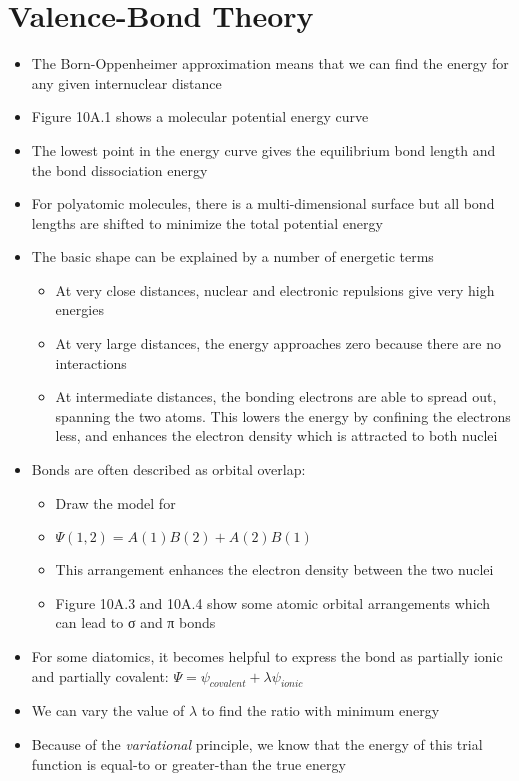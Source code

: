 \documentclass[12pt, openany, letterpaper]{memoir}
\begin{document}
\section{Valence-Bond Theory}
\begin{itemize}
	\item The Born-Oppenheimer approximation means that we can find the energy for any given internuclear distance
	\item Figure 10A.1 shows a molecular potential energy curve
	\item The lowest point in the energy curve gives the equilibrium bond length and the bond dissociation energy
	\item For polyatomic molecules, there is a multi-dimensional surface but all bond lengths are shifted to minimize the total potential energy
	\item The basic shape can be explained by a number of energetic terms
	\begin{itemize}
		\item At very close distances, nuclear and electronic repulsions give very high energies
		\item At very large distances, the energy approaches zero because there are no interactions
		\item At intermediate distances, the bonding electrons are able to spread out, spanning the two atoms. This lowers the energy by confining the electrons less, and enhances the electron density which is attracted to both nuclei
	\end{itemize}
	\item Bonds are often described as orbital overlap:
	\begin{itemize}
		\item Draw the model for 
		\item $\Psi(1,2) = A(1)B(2) + A(2)B(1)$
		\item This arrangement enhances the electron density between the two nuclei
		\item Figure 10A.3 and 10A.4 show some atomic orbital arrangements which can lead to σ and π bonds
	\end{itemize}
	\item For some diatomics, it becomes helpful to express the bond as partially ionic and partially covalent: $\Psi = \psi_{covalent}+\lambda\psi_{ionic}$
	\item We can vary the value of $\lambda$ to find the ratio with minimum energy
	\item Because of the \emph{variational} principle, we know that the energy of this trial function is equal-to or greater-than the true energy

\end{itemize}
\end{document}
